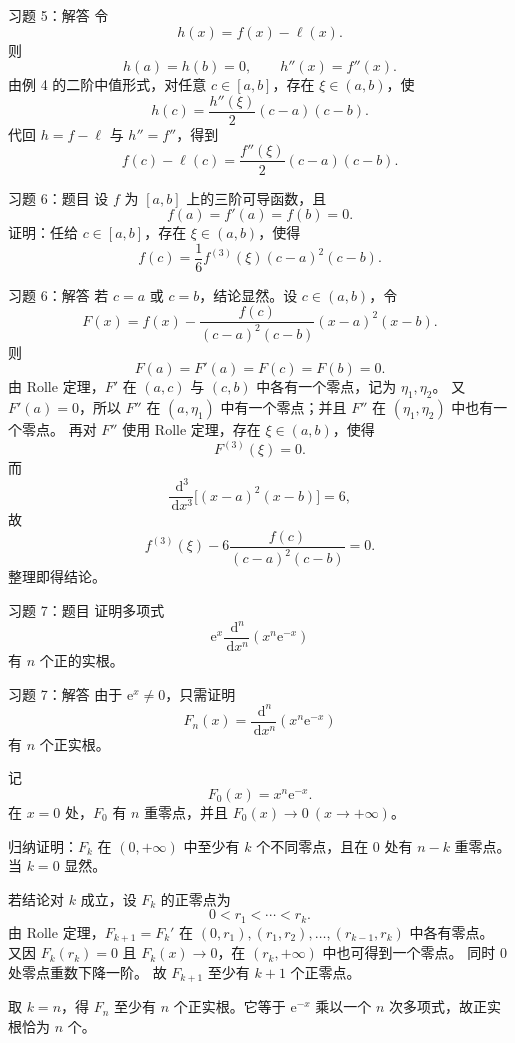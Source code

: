 \documentclass[aspectratio=169,10pt]{ctexbeamer}
\newcommand{\dd}{\,\mathrm{d}}
\newcommand{\ee}{\mathrm{e}}
\begin{document}
\begin{frame}[t]{习题 5：解答}
\small
令
\[
  h(x)=f(x)-\ell(x).
\]
则
\[
  h(a)=h(b)=0,\qquad h''(x)=f''(x).
\]
由例 4 的二阶中值形式，对任意 $c\in[a,b]$，存在 $\xi\in(a,b)$，使
\[
  h(c)=\frac{h''(\xi)}2(c-a)(c-b).
\]
代回 $h=f-\ell$ 与 $h''=f''$，得到
\[
  f(c)-\ell(c)=\frac{f''(\xi)}2(c-a)(c-b).
\]
\end{frame}

\begin{frame}[t]{习题 6：题目}
\small
设 $f$ 为 $[a,b]$ 上的三阶可导函数，且
\[
  f(a)=f'(a)=f(b)=0.
\]
证明：任给 $c\in[a,b]$，存在 $\xi\in(a,b)$，使得
\[
  f(c)=\frac16 f^{(3)}(\xi)(c-a)^2(c-b).
\]
\end{frame}

\begin{frame}[t]{习题 6：解答}
\footnotesize
若 $c=a$ 或 $c=b$，结论显然。设 $c\in(a,b)$，令
\[
  F(x)=f(x)-\frac{f(c)}{(c-a)^2(c-b)}(x-a)^2(x-b).
\]
则
\[
  F(a)=F'(a)=F(c)=F(b)=0.
\]
由 Rolle 定理，$F'$ 在 $(a,c)$ 与 $(c,b)$ 中各有一个零点，记为 $\eta_1,\eta_2$。
又 $F'(a)=0$，所以 $F''$ 在 $(a,\eta_1)$ 中有一个零点；并且 $F''$ 在 $(\eta_1,\eta_2)$ 中也有一个零点。
再对 $F''$ 使用 Rolle 定理，存在 $\xi\in(a,b)$，使得
\[
  F^{(3)}(\xi)=0.
\]
而
\[
  \frac{\dd^3}{\dd x^3}\bigl[(x-a)^2(x-b)\bigr]=6,
\]
故
\[
  f^{(3)}(\xi)-6\frac{f(c)}{(c-a)^2(c-b)}=0.
\]
整理即得结论。
\end{frame}

\begin{frame}[t]{习题 7：题目}
\small
证明多项式
\[
  \ee^x\frac{\dd^n}{\dd x^n}\left(x^n\ee^{-x}\right)
\]
有 $n$ 个正的实根。
\end{frame}

\begin{frame}[t]{习题 7：解答}
\scriptsize
由于 $\ee^x\ne0$，只需证明
\[
  F_n(x)=\frac{\dd^n}{\dd x^n}\left(x^n\ee^{-x}\right)
\]
有 $n$ 个正实根。

记
\[
  F_0(x)=x^n\ee^{-x}.
\]
在 $x=0$ 处，$F_0$ 有 $n$ 重零点，并且 $F_0(x)\to0\ (x\to+\infty)$。

归纳证明：$F_k$ 在 $(0,+\infty)$ 中至少有 $k$ 个不同零点，且在 $0$ 处有 $n-k$ 重零点。
当 $k=0$ 显然。

若结论对 $k$ 成立，设 $F_k$ 的正零点为
\[
  0<r_1<\cdots<r_k.
\]
由 Rolle 定理，$F_{k+1}=F_k'$ 在 $(0,r_1),(r_1,r_2),\ldots,(r_{k-1},r_k)$ 中各有零点。
又因 $F_k(r_k)=0$ 且 $F_k(x)\to0$，在 $(r_k,+\infty)$ 中也可得到一个零点。
同时 $0$ 处零点重数下降一阶。
故 $F_{k+1}$ 至少有 $k+1$ 个正零点。

取 $k=n$，得 $F_n$ 至少有 $n$ 个正实根。它等于 $\ee^{-x}$ 乘以一个 $n$ 次多项式，故正实根恰为 $n$ 个。
\end{frame}
\end{document}

